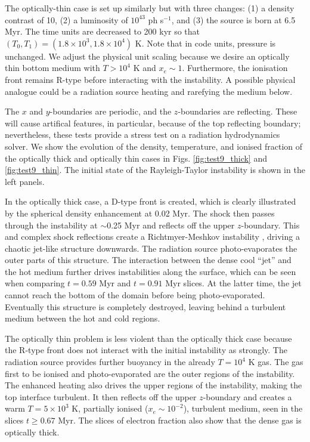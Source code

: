\documentclass[useAMS,usenatbib]{mn2e}
\begin{document}
The optically-thin case is set up similarly but with three changes:
(1) a density contrast of 10, (2) a luminosity of $10^{43}$ ph
s$^{-1}$, and (3) the source is born at 6.5 Myr.  The time units are
decreased to 200 kyr so that $(T_0, T_1) = (1.8 \times 10^3, 1.8
\times 10^4)$ K.  Note that in code units, pressure is unchanged.  We
adjust the physical unit scaling because we desire an optically thin
bottom medium with $T > 10^4$ K and $x_e \sim 1$.  Furthermore, the
ionisation front remains R-type before interacting with the
instability.  A possible physical analogue could be a radiation source
heating and rarefying the medium below.

The $x$ and $y$-boundaries are periodic, and the $z$-boundaries are
reflecting.  These will cause artifical features, in particular,
because of the top reflecting boundary; nevertheless, these tests
provide a stress test on a radiation hydrodynamics solver.  We show
the evolution of the density, temperature, and ionised fraction of the
optically thick and optically thin cases in Figs.
\ref{fig:test9_thick} and \ref{fig:test9_thin}.  The initial state of
the Rayleigh-Taylor instability is shown in the left panels.

In the optically thick case, a D-type front is created, which is
clearly illustrated by the spherical density enhancement at 0.02 Myr.
The shock then passes through the instability at $\sim$0.25 Myr and
reflects off the upper $z$-boundary.  This and complex shock
reflections create a Richtmyer-Meshkov instability \citep[see][for a
review]{RMI}, driving a chaotic jet-like structure downwards.  The
radiation source photo-evaporates the outer parts of this structure.
The interaction between the dense cool ``jet'' and the hot medium
further drives instabilities along the surface, which can be seen when
comparing $t = 0.59$ Myr and $t = 0.91$ Myr slices.  At the latter
time, the jet cannot reach the bottom of the domain before being
photo-evaporated.  Eventually this structure is completely destroyed,
leaving behind a turbulent medium between the hot and cold regions.

The optically thin problem is less violent than the optically thick
case because the R-type front does not interact with the initial
instability as strongly.  The radiation source provides further
buoyancy in the already $T=10^4$ K gas.  The gas first to be ionised
and photo-evaporated are the outer regions of the instability.  The
enhanced heating also drives the upper regions of the instability,
making the top interface turbulent.  It then reflects off the upper
$z$-boundary and creates a warm $T = 5 \times 10^3$ K, partially
ionised ($x_e \sim 10^{-2}$), turbulent medium, seen in the slices $t
\ge 0.67$ Myr.  The slices of electron fraction also show that the
dense gas is optically thick.
\end{document}
